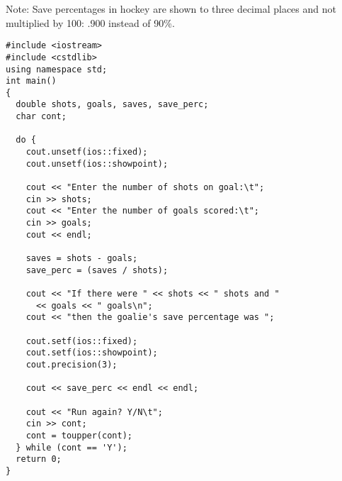 \begin{enumerate}
Note: Save percentages in hockey are shown to three decimal places and not multiplied by 100: .900 instead of 90\%. \nopagebreak[4]

\noindent\begin{minipage}{\linewidth}\begin{lstlisting}
#include <iostream>
#include <cstdlib>
using namespace std;
int main()
{
  double shots, goals, saves, save_perc;
  char cont;

  do {
    cout.unsetf(ios::fixed);
    cout.unsetf(ios::showpoint);

    cout << "Enter the number of shots on goal:\t";
    cin >> shots;
    cout << "Enter the number of goals scored:\t";
    cin >> goals;
    cout << endl;

    saves = shots - goals;
    save_perc = (saves / shots);

    cout << "If there were " << shots << " shots and " 
      << goals << " goals\n";
    cout << "then the goalie's save percentage was ";

    cout.setf(ios::fixed);
    cout.setf(ios::showpoint);
    cout.precision(3);

    cout << save_perc << endl << endl;

    cout << "Run again? Y/N\t";
    cin >> cont;
    cont = toupper(cont);
  } while (cont == 'Y');
  return 0;
}
\end{lstlisting}\end{minipage}

\end{enumerate}

%

